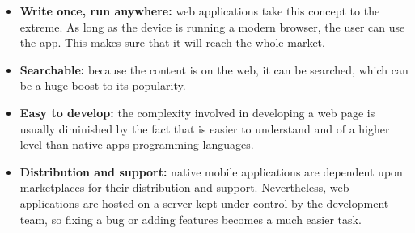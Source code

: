 \begin{itemize}
	\item \textbf{Write once, run anywhere:} web applications take this concept to the extreme. As long as the device is running a modern browser, the user can use the app. This makes sure that it will reach the whole market. 
	\item \textbf{Searchable:} because the content is on the web, it can be searched, which can be a huge boost to its popularity.
	\item \textbf{Easy to develop:} the complexity involved in developing a web page is usually diminished by the fact that is easier to understand and of a higher level than native apps programming languages.
	\item \textbf{Distribution and support:} native mobile applications are dependent upon marketplaces for their distribution and support. Nevertheless, web applications are hosted on a server kept under control by the development team, so fixing a bug or adding features becomes a much easier task.
\end{itemize}

